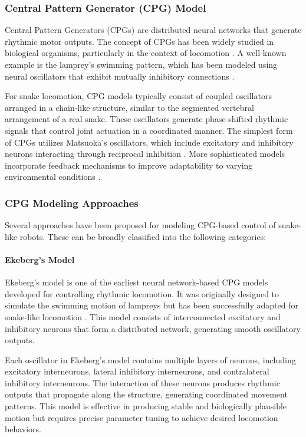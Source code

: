 \documentclass[12pt,a4paper]{report}
\begin{document}
\subsubsection{Central Pattern Generator (CPG) Model}

Central Pattern Generators (CPGs) are distributed neural networks that generate rhythmic motor outputs. The concept of CPGs has been widely studied in biological organisms, particularly in the context of locomotion \cite{ijspeert2008central}. A well-known example is the lamprey’s swimming pattern, which has been modeled using neural oscillators that exhibit mutually inhibitory connections \cite{ekeberg1993combined}.

For snake locomotion, CPG models typically consist of coupled oscillators arranged in a chain-like structure, similar to the segmented vertebral arrangement of a real snake. These oscillators generate phase-shifted rhythmic signals that control joint actuation in a coordinated manner. The simplest form of CPGs utilizes Matsuoka’s oscillators, which include excitatory and inhibitory neurons interacting through reciprocal inhibition \cite{matsuoka1985sustained}. More sophisticated models incorporate feedback mechanisms to improve adaptability to varying environmental conditions \cite{kimura2001adaptive}.

\subsubsection{CPG Modeling Approaches}

Several approaches have been proposed for modeling CPG-based control of snake-like robots. These can be broadly classified into the following categories:

\paragraph{Ekeberg’s Model}
Ekeberg’s model is one of the earliest neural network-based CPG models developed for controlling rhythmic locomotion. It was originally designed to simulate the swimming motion of lampreys but has been successfully adapted for snake-like locomotion \cite{ekeberg1993combined}. This model consists of interconnected excitatory and inhibitory neurons that form a distributed network, generating smooth oscillatory outputs.

Each oscillator in Ekeberg’s model contains multiple layers of neurons, including excitatory interneurons, lateral inhibitory interneurons, and contralateral inhibitory interneurons. The interaction of these neurons produces rhythmic outputs that propagate along the structure, generating coordinated movement patterns. This model is effective in producing stable and biologically plausible motion but requires precise parameter tuning to achieve desired locomotion behaviors.
\end{document}
